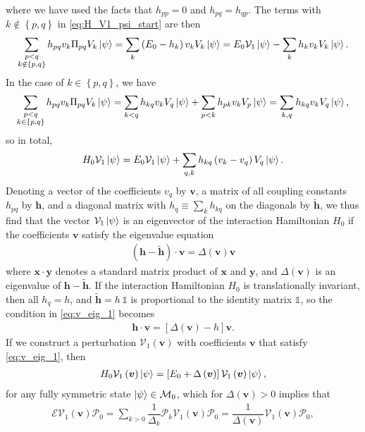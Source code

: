 \documentclass[nofootinbib,notitlepage,11pt]{revtex4-2}
\newcommand{\f}[2]{\dfrac{#1}{#2}} %
\newcommand{\p}[1]{\left(#1\right)} %
\renewcommand{\sp}[1]{\left[#1\right]} %
\renewcommand{\set}[1]{\left\{#1\right\}} %
\renewcommand{\v}{\bm} %
\renewcommand{\c}{\cdot} %
\newcommand{\1}{\mathds{1}}
\newcommand{\E}{\mathcal{E}}
\newcommand{\M}{\mathcal{M}}
\renewcommand{\P}{\mathcal{P}}
\newcommand{\V}{\mathcal{V}}
\begin{document}
where we have used the facts that $h_{pp}=0$ and $h_{pq}=h_{qp}$.  The
terms with $k\notin\set{p,q}$ in \eqref{eq:H_V1_psi_start} are then
\begin{align}
  \sum_{\substack{p<q\\k\notin\set{p,q}}}
  h_{pq} v_k \Pi_{pq} V_k \ket\psi
  = \sum_k \p{E_0 - h_k} v_k V_k \ket\psi
  = E_0 \V_1 \ket\psi - \sum_k h_k v_k V_k \ket\psi.
\end{align}
In the case of $k\in\set{p,q}$, we have
\begin{align}
  \sum_{\substack{p<q\\k\in\set{p,q}}}
  h_{pq} v_k \Pi_{pq} V_k \ket\psi
  = \sum_{k<q} h_{kq} v_k V_q \ket\psi
  + \sum_{p<k} h_{pk} v_k V_p \ket\psi
  = \sum_{k,q} h_{kq} v_k V_q \ket\psi,
\end{align}
so in total,
\begin{align}
  H_0 \V_1 \ket\psi
  = E_0 \V_1 \ket\psi + \sum_{q,k} h_{kq} \p{v_k - v_q} V_q \ket\psi.
  \label{eq:H_V1_psi}
\end{align}
Denoting a vector of the coefficients $v_q$ by $\v v$, a matrix of all
coupling constants $h_{pq}$ by $\v h$, and a diagonal matrix with
$h_q\equiv\sum_k h_{kq}$ on the diagonals by $\tilde{\v h}$, we thus
find that the vector $\V_1\ket\psi$ is an eigenvector of the
interaction Hamiltonian $H_0$ if the coefficients $\v v$ satisfy the
eigenvalue equation
\begin{align}
  \p{\v h - \tilde{\v h}}\c\v v = \Delta\p{\v v} \v v
  \label{eq:v_eig_1}
\end{align}
where $\v x\c\v y$ denotes a standard matrix product of $\v x$ and
$\v y$, and $\Delta\p{\v v}$ is an eigenvalue of
$\v h - \tilde{\v h}$.  If the interaction Hamiltonian $H_0$ is
translationally invariant, then all $h_q=h$, and $\tilde{\v h}=h\,\1$
is proportional to the identity matrix $\1$, so the condition in
\eqref{eq:v_eig_1} becomes
\begin{align}
  \v h \c\v v = \sp{\Delta\p{\v v}-h} \v v.
\end{align}
If we construct a perturbation $\V_1\p{\v v}$ with coefficients $\v v$
that satisfy \eqref{eq:v_eig_1}, then
\begin{align}
  H_0 \V_1\p{\v v} \ket\psi
  = \sp{E_0 + \Delta\p{\v v}} \V_1\p{\v v} \ket\psi,
\end{align}
for any fully symmetric state $\ket\psi\in\M_0$, which for
$\Delta\p{\v v}>0$ implies that
\begin{align}
  \E \V_1\p{\v v} \P_0
  = \sum_{k>0} \f1{\Delta_k} \P_k \V_1\p{\v v} \P_0
  = \f1{\Delta\p{\v v}} \V_1\p{\v v} \P_0,
\end{align}
\end{document}
